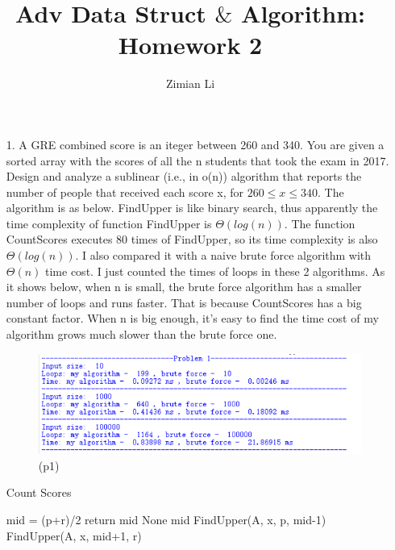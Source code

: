 \documentclass{article}       %
\title{Adv Data Struct $\&$ Algorithm: Homework 2}
\author{Zimian Li}
\begin{document}
        
\maketitle

\begin{enumerate}
	\item[1.] A GRE combined score is an iteger between 260 and 340. You are given a sorted array with the scores of all the n students that took the exam in 2017. Design and analyze a sublinear (i.e., in o(n)) algorithm that reports the number of people that received each score x, for $260 \leq x \leq 340$.\newline\newline
	The algorithm is as below. FindUpper is like binary search, thus apparently the time complexity of function FindUpper is $\Theta (log(n))$. The function CountScores executes 80 times of FindUpper, so its time complexity is also  $\Theta (log(n))$.\newline
	I also compared it with a naive brute force algorithm with $\Theta (n)$ time cost. I just counted the times of loops in these 2 algorithms. As it shows below, when n is small, the brute force algorithm has a smaller number of loops and runs faster. That is because CountScores has a big constant factor. When n is big enough, it's easy to find the time cost of my algorithm grows much slower than the brute force one.\newline
	\begin{figure}[H]
		\centering
		\includegraphics[width=15cm]{p1}
		\caption{(p1)}
		\label{p1}
	\end{figure}
	 \begin{algorithm}[H]
		\caption{Count Scores}
		\small
		\begin{algorithmic}[1]
			\State mid = (p+r)/2
			\State return mid
			\Else \State \Return None
			\EndIf
			\Else {}
			\State \Return mid
			\EndIf
			\State \Return FindUpper(A, x, p, mid-1)
			\EndIf
			\State \Return FindUpper(A, x, mid+1, r)
			\EndIf
			\EndIf
			\EndProcedure
			

\end{algorithmic}
\end{algorithm}
\end{enumerate}
\end{document}
